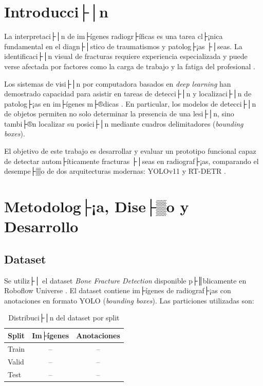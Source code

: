 ﻿\documentclass[conference]{IEEEtran}
\begin{document}
\section{Introducci├│n}

La interpretaci├│n de im├ígenes radiogr├íficas es una tarea cl├¡nica fundamental en
el diagn├│stico de traumatismos y patolog├¡as ├│seas. La identificaci├│n visual de
fracturas requiere experiencia especializada y puede verse afectada por factores
como la carga de trabajo y la fatiga del profesional \cite{b1}.

Los sistemas de visi├│n por computadora basados en \textit{deep learning} han
demostrado capacidad para asistir en tareas de detecci├│n y localizaci├│n de
patolog├¡as en im├ígenes m├®dicas \cite{b2}. En particular, los modelos de
detecci├│n de objetos permiten no solo determinar la presencia de una lesi├│n,
sino tambi├®n localizar su posici├│n mediante cuadros delimitadores
(\textit{bounding boxes}).


El objetivo de este trabajo es desarrollar y evaluar un prototipo funcional
capaz de detectar autom├íticamente fracturas ├│seas en radiograf├¡as, comparando
el desempe├▒o de dos arquitecturas modernas: YOLOv11 \cite{b3} y RT-DETR \cite{b4}.

\section{Metodolog├¡a, Dise├▒o y Desarrollo}

\subsection{Dataset}

Se utiliz├│ el dataset \textit{Bone Fracture Detection} disponible p├║blicamente
en Roboflow Universe \cite{b5}. El dataset contiene im├ígenes de radiograf├¡as con
anotaciones en formato YOLO (\textit{bounding boxes}). Las particiones utilizadas
son:

\begin{table}[htbp]
\caption{Distribuci├│n del dataset por split}
\begin{center}
\begin{tabular}{lcc}
\toprule
\textbf{Split} & \textbf{Im├ígenes} & \textbf{Anotaciones} \\
\midrule
Train & -- & -- \\  %
Valid & -- & -- \\
Test  & -- & -- \\
\bottomrule
\end{tabular}
\end{center}
\end{table}
\end{document}
